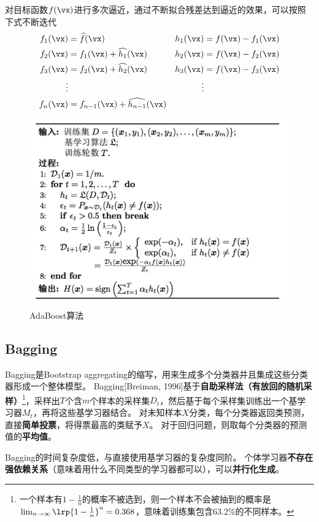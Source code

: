 对目标函数$f(\vx)$进行多次逼近，通过不断拟合残差达到逼近的效果，可以按照下式不断迭代
\[\begin{aligned}
f_1(\vx) &=\widehat{f}(\vx)            & h_1(\vx) &=f(\vx)-f_1(\vx)\\
f_2(\vx) &=f_1(\vx)+\widehat{h_1}(\vx) & h_2(\vx) &=f(\vx)-f_2(\vx)\\
f_3(\vx) &=f_2(\vx)+\widehat{h_2}(\vx) & h_3(\vx) &=f(\vx)-f_3(\vx)\\
\vdots   &                             & \vdots \\
f_n(\vx) &=f_{n-1}(\vx)+\widehat{h_{n-1}}(\vx)
\end{aligned}\]

\begin{figure}[H]
\centering
\includegraphics[width=0.8\linewidth]{fig/adaboost.jpg}
\caption{AdaBoost算法}
\end{figure}

\subsection{Bagging}
Bagging是Bootstrap aggregating的缩写，用来生成多个分类器并且集成这些分类器形成一个整体模型。
Bagging[Breiman, 1996]基于\textbf{自助采样法（有放回的随机采样）}\footnote{一个样本有$1-\frac{1}{n}$的概率不被选到，则一个样本不会被抽到的概率是$\lim_{n\to\infty}\lrp{1-\frac{1}{n}}^n=0.368$，意味着训练集包含63.2\%的不同样本。}，采样出$T$个含$m$个样本的采样集$D_t$，然后基于每个采样集训练出一个基学习器$M_t$，再将这些基学习器结合。
对未知样本$X$分类，每个分类器返回类预测，直接\textbf{简单投票}，将得票最高的类赋予$X$。
对于回归问题，则取每个分类器的预测值的\textbf{平均值}。

Bagging的时间复杂度低，与直接使用基学习器的复杂度同阶。
个体学习器\textbf{不存在强依赖关系}（意味着用什么不同类型的学习器都可以），可以\textbf{并行化生成}。

